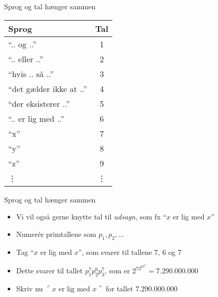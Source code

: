 \documentclass{beamer}
\newcommand{\godel}[1]{\ulcorner #1 \urcorner}
\begin{document}
\begin{frame}{Sprog og tal hænger sammen}
  \begin{center}
  \begin{tabular}{lc}
    Sprog & Tal\\\hline
    ``.. og ..'' & 1\\
    ``.. eller ..'' & 2\\
    ``hvis .. så ..'' & 3\\
    ``det gælder ikke at ..'' & 4\\
    ``der eksisterer ..'' & 5\\
    ``.. er lig med ..'' & 6\\
    ``x'' & 7\\
    ``y'' & 8\\
    ``z'' & 9\\
    \vdots & \vdots
  \end{tabular}
  \end{center}
\end{frame}

\begin{frame}{Sprog og tal hænger sammen}
  \begin{itemize}
    \item Vi vil også gerne knytte tal til \textit{udsagn}, som fx ``$x$ er lig med $x$''
    \pause\item Numerér primtallene som $p_1,p_2,\hdots$
    \pause\item Tag ``$x$ er lig med $x$'', som svarer til tallene $7$, $6$ og $7$
    \pause\item Dette svarer til tallet $p_1^7p_2^6p_3^7$, som er $2^73^65^7=7.290.000.000$
    \pause\item Skriv nu $\godel{\text{$x$ er lig med $x$}}$ for tallet $7.290.000.000$
  \end{itemize}
\end{frame}
\end{document}

